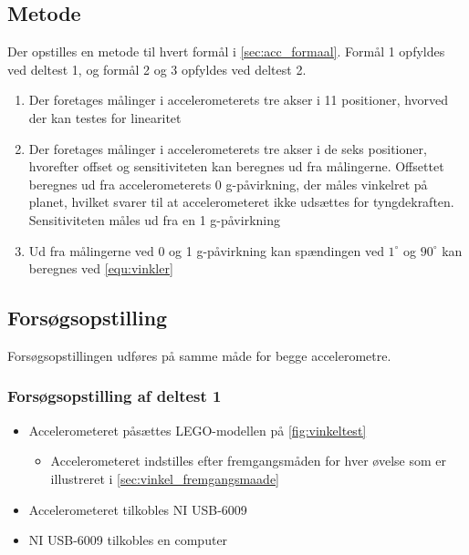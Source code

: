 \subsection{Metode}
Der opstilles en metode til hvert formål i \autoref{sec:acc_formaal}. Formål 1 opfyldes ved deltest 1, og formål 2 og 3 opfyldes ved deltest 2. 
\begin{enumerate}
\item Der foretages målinger i accelerometerets tre akser i 11 positioner, hvorved der kan testes for linearitet
\item Der foretages målinger i accelerometerets tre akser i de seks positioner, hvorefter offset og sensitiviteten kan beregnes ud fra målingerne. Offsettet beregnes ud fra accelerometerets 0 g-påvirkning, der måles vinkelret på planet, hvilket svarer til at accelerometeret ikke udsættes for tyngdekraften. Sensitiviteten måles ud fra en 1 g-påvirkning
\item Ud fra målingerne ved 0 og 1 g-påvirkning kan spændingen ved $1^{\circ}$ og $90^{\circ}$ kan beregnes ved \autoref{equ:vinkler}
\end{enumerate}

\subsection{Forsøgsopstilling}
Forsøgsopstillingen udføres på samme måde for begge accelerometre.

\subsubsection{Forsøgsopstilling af deltest 1}
\begin{itemize}
\item Accelerometeret påsættes LEGO-modellen på \autoref{fig:vinkeltest}
\begin{itemize}
\item Accelerometeret indstilles efter fremgangsmåden for hver øvelse som er illustreret i \autoref{sec:vinkel_fremgangsmaade}
\end{itemize}
\item Accelerometeret tilkobles NI USB-6009
\item NI USB-6009 tilkobles en computer
\end{itemize}

